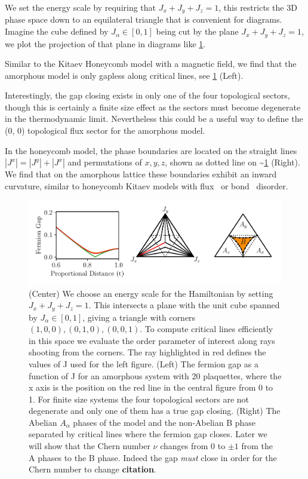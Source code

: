 We set the energy scale by requiring that \(J_x + J_y + J_z = 1\), this restricts the 3D phase space down to an equilateral triangle that is convenient for diagrams. Imagine the cube defined by \(J_\alpha \in [0,1]\) being cut by the plane \(J_x + J_y + J_z = 1\), we plot the projection of that plane in diagrams like \cref{fig:phase_diagram}.

Similar to the Kitaev Honeycomb model with a magnetic field, we find that the amorphous model is only gapless along critical lines, see \cref{fig:phase_diagram} (Left).

Interestingly, the gap closing exists in only one of the four topological sectors, though this is certainly a finite size effect as the sectors must become degenerate in the thermodynamic limit. Nevertheless this could be a useful way to define the (0, 0) topological flux sector for the amorphous model.

In the honeycomb model, the phase boundaries are located on the straight lines \(|J^x| = |J^y| + |J^x|\) and permutations of \(x,y,z\), shown as dotted line on \textasciitilde{}\cref{fig:phase_diagram} (Right). We find that on the amorphous lattice these boundaries exhibit an inward curvature, similar to honeycomb Kitaev models with flux~\autocite{Nasu_Thermal_2015} or bond~\autocite{knolle_dynamics_2016} disorder.

\hypertarget{fig:phase_diagram}{%
\begin{figure}
\centering
\includegraphics[width=1\textwidth,height=\textheight]{figure_code/amk_chapter/results/phase_diagram/phase_diagram}
\caption[{The Ground State Phase Diagram}]{(Center) We choose an energy scale for the Hamiltonian by setting \(J_x + J_y + J_z = 1\). This intersects a plane with the unit cube spanned by \(J_\alpha \in [0,1]\), giving a triangle with corners \((1,0,0), (0,1,0), (0,0,1)\). To compute critical lines efficiently in this space we evaluate the order parameter of interest along rays shooting from the corners. The ray highlighted in red defines the values of J used for the left figure. (Left) The fermion gap as a function of J for an amorphous system with 20 plaquettes, where the x axis is the position on the red line in the central figure from 0 to 1. For finite size systems the four topological sectors are not degenerate and only one of them has a true gap closing. (Right) The Abelian \(A_\alpha\) phases of the model and the non-Abelian B phase separated by critical lines where the fermion gap closes. Later we will show that the Chern number \(\nu\) changes from \(0\) to \(\pm 1\) from the A phases to the B phase. Indeed the gap \emph{must} close in order for the Chern number to change \textbf{citation}.}
\label{fig:phase_diagram}
\end{figure}
}


